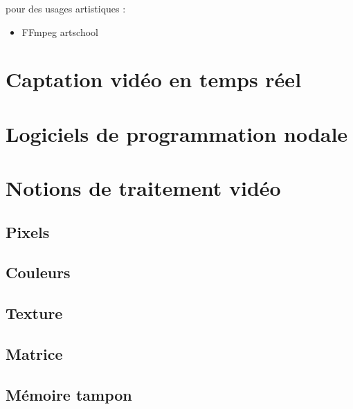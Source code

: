 \documentclass[
]{book}
\providecommand{\tightlist}{%
  \setlength{\itemsep}{0pt}\setlength{\parskip}{0pt}}
\begin{document}
pour des usages artistiques :

\begin{itemize}
\tightlist
\item
  FFmpeg artschool \citep{associationofmovingimagearchivists_FFmpegArtschool_2020}
\end{itemize}

\hypertarget{captation-viduxe9o-en-temps-ruxe9el}{%
\section{Captation vidéo en temps réel}\label{captation-viduxe9o-en-temps-ruxe9el}}

\hypertarget{logiciels-de-programmation-nodale}{%
\section{Logiciels de programmation nodale}\label{logiciels-de-programmation-nodale}}

\hypertarget{notions-de-traitement-viduxe9o}{%
\section{Notions de traitement vidéo}\label{notions-de-traitement-viduxe9o}}

\hypertarget{pixels}{%
\subsection{Pixels}\label{pixels}}

\hypertarget{couleurs}{%
\subsection{Couleurs}\label{couleurs}}

\hypertarget{texture}{%
\subsection{Texture}\label{texture}}

\hypertarget{matrice}{%
\subsection{Matrice}\label{matrice}}

\hypertarget{muxe9moire-tampon}{%
\subsection{Mémoire tampon}\label{muxe9moire-tampon}}
\end{document}
